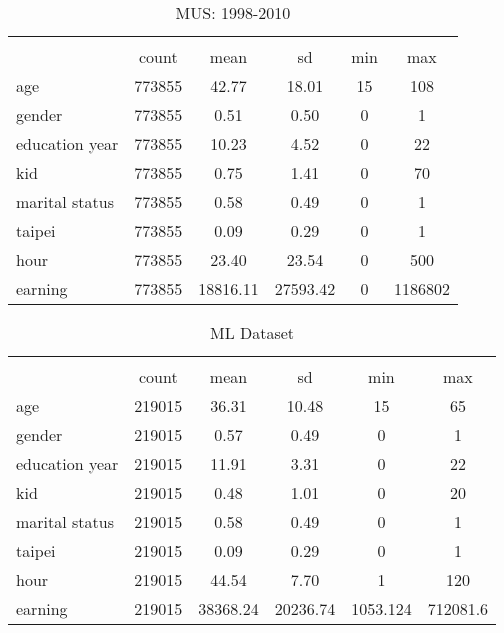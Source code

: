 \begin{table}[htbp]\centering
\def\sym#1{\ifmmode^{#1}\else\(^{#1}\)\fi}
\caption{MUS: 1998-2010\label{tab:mus9810}}
\begin{tabular}{l*{1}{ccccc}}
\hline\hline
            &\multicolumn{5}{c}{}                                            \\
            &       count&        mean&          sd&         min&         max\\
\hline
age         &      773855&       42.77&       18.01&          15&         108\\
gender      &      773855&        0.51&        0.50&           0&           1\\
education year&      773855&       10.23&        4.52&           0&          22\\
kid         &      773855&        0.75&        1.41&           0&          70\\
marital status&      773855&        0.58&        0.49&           0&           1\\
taipei      &      773855&        0.09&        0.29&           0&           1\\
hour        &      773855&       23.40&       23.54&           0&         500\\
earning     &      773855&    18816.11&    27593.42&           0&     1186802\\
\hline\hline
\end{tabular}
\end{table}
\begin{table}[htbp]\centering
\def\sym#1{\ifmmode^{#1}\else\(^{#1}\)\fi}
\caption{ML Dataset\label{tab:train}}
\begin{tabular}{l*{1}{ccccc}}
\hline\hline
            &\multicolumn{5}{c}{}                                            \\
            &       count&        mean&          sd&         min&         max\\
\hline
age         &      219015&       36.31&       10.48&          15&          65\\
gender      &      219015&        0.57&        0.49&           0&           1\\
education year&      219015&       11.91&        3.31&           0&          22\\
kid         &      219015&        0.48&        1.01&           0&          20\\
marital status&      219015&        0.58&        0.49&           0&           1\\
taipei      &      219015&        0.09&        0.29&           0&           1\\
hour        &      219015&       44.54&        7.70&           1&         120\\
earning     &      219015&    38368.24&    20236.74&    1053.124&    712081.6\\
\hline\hline
\end{tabular}
\end{table}
